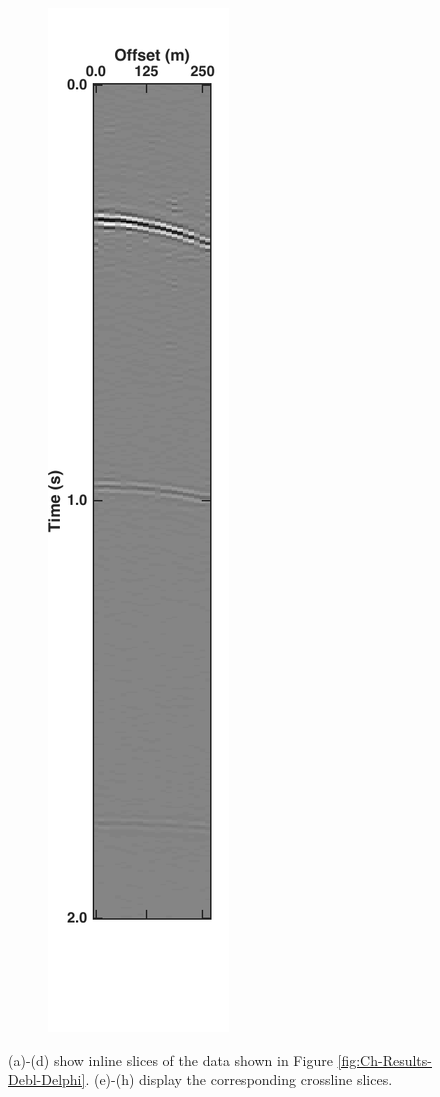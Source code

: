 \begin{figure}
\begin{subfigure}[t]{0.24\textwidth}
		\caption{}
		\label{fig:Ch-Results-Debl-xline10-t}
	\end{subfigure}
	\centering
	\begin{subfigure}[t]{0.24\textwidth}
		\centering
		\includegraphics[height = 0.38\textheight]{Plots/BlendingPatterns/Deblended_xline10xt}
		\caption{}
		\label{fig:Ch-Results-Debl-xline10-xt}
	\end{subfigure}
	
	\caption{(a)-(d) show inline slices of the data shown in Figure \ref{fig:Ch-Results-Debl-Delphi}. (e)-(h) display the corresponding crossline slices. }
	\label{fig:Ch-Results-Debl-x-inline}

\end{figure}


